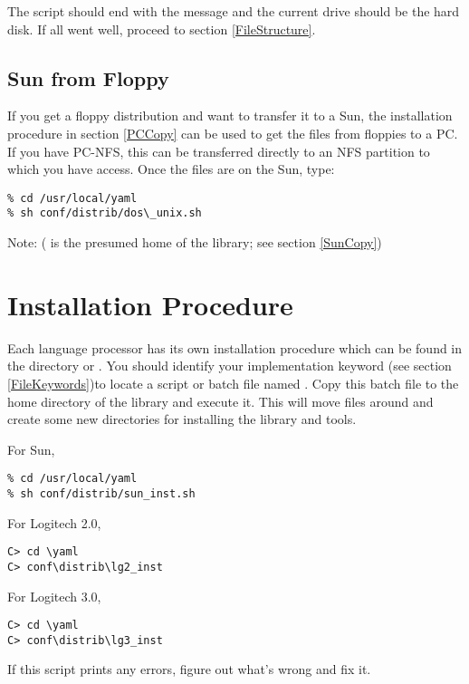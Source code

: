 The script should end with the message  and the current
drive should be the hard disk.
If all went well, proceed to section \ref{FileStructure}.

\subsection{Sun from Floppy}
If you get a floppy distribution and want to transfer it to a Sun,
the installation procedure in section \ref{PCCopy} 
can be used to get the files from
floppies to a PC.  If you have PC-NFS, this can be transferred directly to an
NFS partition to which you have access.  Once the files are on the
Sun, type:

\begin{verbatim}
% cd /usr/local/yaml
% sh conf/distrib/dos\_unix.sh
\end{verbatim}
Note: ( is the presumed home
of the library; see section \ref{SunCopy})

\section{Installation Procedure}
\label{InstallProcedure}

Each language processor has its own installation procedure which can be
found in the directory  
or .
You should identify your implementation keyword 
(see section \ref{FileKeywords})to locate a script or batch file
named .  Copy this batch file to the home directory
of the library and execute it.  This will move files around and
create some new directories for installing the library and tools.

For Sun,

\begin{verbatim}
% cd /usr/local/yaml
% sh conf/distrib/sun_inst.sh
\end{verbatim}

For Logitech 2.0,
\begin{verbatim}
C> cd \yaml
C> conf\distrib\lg2_inst
\end{verbatim}

For Logitech 3.0,
\begin{verbatim}
C> cd \yaml
C> conf\distrib\lg3_inst
\end{verbatim}

If this script prints any errors, figure out what's wrong and fix it.


